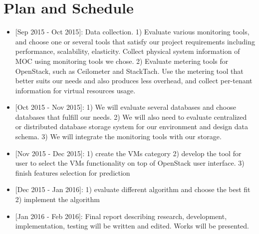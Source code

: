\section{Plan and Schedule}
\label{sec:Plan}

\begin{itemize}
\item{[Sep 2015 - Oct 2015]:} Data collection. 1) Evaluate various monitoring tools, and choose one or several tools that satisfy our project requirements including performance, scalability, elasticity. Collect physical system information of MOC using monitoring tools we chose. 2) Evaluate metering tools for OpenStack, such as Ceilometer and StackTach. Use the metering tool that better suits our needs and also produces less overhead, and collect per-tenant information for virtual resources usage.
\item{[Oct 2015 - Nov 2015]:} 1) We will evaluate several databases and choose databases that fulfill our needs. 2) We will also need to evaluate centralized or distributed database storage system for our environment and design data schema. 3) We will integrate the monitoring tools with our storage.
\item{[Nov 2015 - Dec 2015]:} 1) create the VMs category 2) develop the tool for user to select the VMs functionality on top of OpenStack user interface. 3) finish features selection for prediction
\item{[Dec 2015 - Jan 2016]:} 1) evaluate different algorithm and choose the best fit 2) implement the algorithm
\item{[Jan 2016 - Feb 2016]:} Final report describing research, development, implementation, testing will be written and edited. Works will be presented.
\end{itemize}

